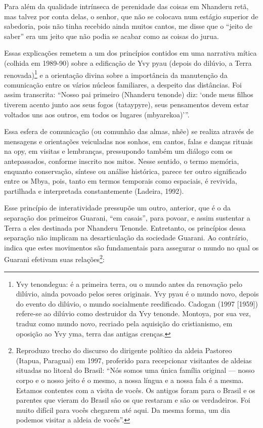 Para além da qualidade intrínseca de perenidade das coisas em Nhanderu
retã, mas talvez por conta delas, o senhor, que não se colocava num
estágio superior de sabedoria, pois não tinha recebido ainda muitos
cantos, me disse que o ``jeito de saber'' era um jeito que não podia se
acabar como as coisas do jurua.

Essas explicações remetem a um dos princípios contidos em uma narrativa
mítica (colhida em 1989-90) sobre a edificação de Yvy pyau (depois do
dilúvio, a Terra renovada)\footnote{Yvy tenondegua: é a primeira terra,
ou o mundo antes da renovação pelo dilúvio, ainda povoado pelos seres
originais. Yvy pyau é o mundo novo, depois do evento do dilúvio, o
mundo socialmente reedificado. Cadogan (1997 [1959]) refere-se ao
dilúvio como destruidor da Yvy tenonde. Montoya, por sua vez, traduz
como mundo novo, recriado pela aquisição do cristianismo, em oposição
ao Yvy yma, terra das antigas crenças. } e a orientação divina sobre a
importância da manutenção da comunicação entre os vários núcleos
familiares, a despeito das distâncias. Foi assim transcrita: ``Nosso pai
primeiro (Nhanderu tenonde) diz: ‘onde meus filhos tiverem acento junto
aos seus fogos (tataypyre), seus pensamentos devem estar voltados uns
aos outros, em todos os lugares (mbyarekoa)’''. 

Essa esfera de comunicação (ou comunhão das almas, nhẽe) se
realiza através de mensagens e orientações veiculadas nos sonhos, em
cantos, falas e danças rituais na opy, em visitas e lembranças,
pressupondo também um diálogo com os antepassados, conforme inscrito
nos mitos. Nesse sentido, o termo memória, enquanto conservação,
síntese ou análise histórica, parece ter outro significado entre os
Mbya, pois, tanto em termos temporais como espaciais, é revivida,
partilhada e interpretada constantemente (Ladeira, 1992).  

Esse princípio de interatividade pressupõe um outro, anterior, que é o
da separação dos primeiros Guarani, ``em casais'', para povoar, e assim
sustentar a Terra a eles destinada por Nhanderu Tenonde. Entretanto, os
princípios dessa separação não implicam na desarticulação da sociedade
Guarani. Ao contrário, indica que estes movimentos são fundamentais
para assegurar o mundo no qual os Guarani efetivam suas
relações\footnote{Reproduzo trecho do discurso do dirigente político da
aldeia Pastoreo (Itapua, Paraguai) em 1997, proferido para recepcionar
visitantes de aldeias situadas no litoral do Brasil: ``Nós somos uma
única família original — nosso corpo e o nosso jeito é o mesmo, a nossa
língua e a nossa fala é a mesma. Estamos contentes com a visita de
vocês. Os antigos foram para o Brasil e os parentes que vieram do
Brasil são os que restaram e são os verdadeiros. Foi muito difícil para
vocês chegarem até aqui. Da mesma forma, um dia podemos visitar a
aldeia de vocês''.}:

